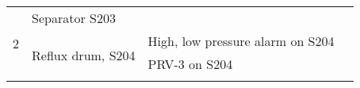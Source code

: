 \begin{table}[]
{\begin{tabular}{@{}llll@{}}
\multicolumn{1}{l|}{\multirow{9}{*}{2}}  & \multicolumn{1}{l|}{\multirow{2}{*}{Separator S203}}            & \multicolumn{1}{l|}{}                                                                                                                                                                                                         & \multicolumn{1}{l|}{}                                                                                                                                                                                                       \\ \cmidrule(l){3-4} 
\multicolumn{1}{l|}{}                    & \multicolumn{1}{l|}{}                                           & \multicolumn{1}{l|}{}                                                                                                                                                                                                         & \multicolumn{1}{l|}{}                                                                                                                                                                                                       \\ \cmidrule(l){2-4} 
\multicolumn{1}{l|}{}                    & \multicolumn{1}{l|}{\multirow{3}{*}{Reflux   drum, S204}}       & \multicolumn{1}{l|}{High, low pressure   alarm on S204}                                                                                                                                                                       & \multicolumn{1}{l|}{}                                                                                                                                                                                                       \\ \cmidrule(l){3-4} 
\multicolumn{1}{l|}{}                    & \multicolumn{1}{l|}{}                                           & \multicolumn{1}{l|}{PRV-3 on S204}                                                                                                                                                                                            & \multicolumn{1}{l|}{}                                                                                                                                                                                                       \\ \cmidrule(l){3-4} 
\multicolumn{1}{l|}{}                    & \multicolumn{1}{l|}{}                                           & \multicolumn{1}{l|}{}                                                                                                                                                                                                         & \multicolumn{1}{l|}{}                                                                                                                                                                                                       \\ \cmidrule(l){2-4} 

\end{tabular}}
\end{table}
